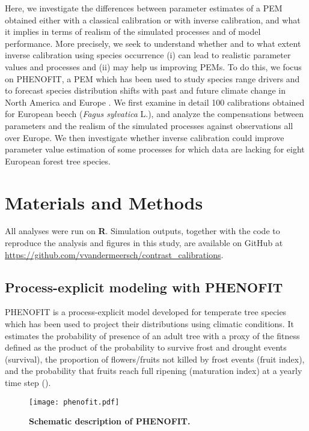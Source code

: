 \documentclass[preprint,12pt,authoryear]{elsarticle}
\begin{document}
Here, we investigate the differences between parameter estimates of a PEM obtained either with a classical calibration or with inverse calibration, and what it implies in terms of realism of the simulated processes and of model performance. More precisely, we seek to understand whether and to what extent inverse calibration using species occurrence (i) can lead to realistic parameter values and processes and (ii) may help us improving PEMs. To do this, we focus on PHENOFIT, a PEM which has been used to study species range \textcolor{customred}{drivers} and to forecast species distribution shifts with past and future climate change in North America and Europe
\citep{Morin2007, Saltre2013, Saltre2015, Cheaib2012, VanderMeersch2025}. We first examine in detail 100 calibrations obtained for European beech (\emph{Fagus sylvatica} L.), and analyze the compensations between parameters and the realism of the simulated processes against observations all over Europe. We then investigate whether inverse calibration could improve parameter value estimation of some processes for which data are lacking for eight European forest tree species. 

\section{Materials and Methods}

\textcolor{customred}{All analyses were run on \textbf{\textsf{R}}. Simulation outputs, together with the code to reproduce the analysis and figures in this study, are available on GitHub at \url{https://github.com/vvandermeersch/contrast_calibrations}.}

\subsection{Process-explicit modeling with PHENOFIT}

PHENOFIT is a process-explicit model developed for temperate tree species which has been used to project their distributions using climatic conditions. It estimates the probability of presence of an adult tree \textcolor{customred}{with a proxy of the fitness} defined as the product of the probability to survive frost and drought events (survival), the proportion of flowers/fruits not killed by frost events (fruit index), and the probability that fruits reach full ripening (maturation index) at a yearly time step ().

\begin{figure}[t]
\centering
\texttt{[image: phenofit.pdf]}
\caption{\textbf{Schematic description of PHENOFIT.}}
\label{fig:phenofit}
\end{figure}
\end{document}
